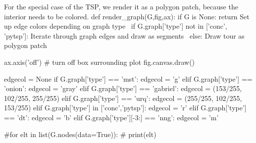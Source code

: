 For the special case of the TSP, we render it as a polygon patch, because the interior
needs to be colored. 
\nwenddocs{}\plusendmoddef\nwstartdeflinemarkup{}\nwenddeflinemarkup
def render_graph(G,fig,ax):
     if G is None:
            return
     \LA{}Set up edge colors depending on graph type~{\nwtagstyle{}}\RA{}
     if G.graph['type'] not in ['conc', 'pytsp']:
          \LA{}Iterate through graph edges and draw as segments~{\nwtagstyle{}}\RA{}
     else:
          \LA{}Draw tour as polygon patch~{\nwtagstyle{}}\RA{}
          
     ax.axis('off') # turn off box surrounding plot
     fig.canvas.draw()
\nwendcode{}\nwdocspar

\nwenddocs{}\endmoddef\nwstartdeflinemarkup{}\nwenddeflinemarkup
edgecol = None
if G.graph['type'] == 'mst':
     edgecol = 'g'
elif G.graph['type'] == 'onion':
     edgecol = 'gray'
elif G.graph['type'] == 'gabriel':
     edgecol = (153/255, 102/255, 255/255)
elif G.graph['type'] == 'urq':
     edgecol = (255/255, 102/255, 153/255)
elif G.graph['type'] in ['conc','pytsp']:
     edgecol = 'r'
elif G.graph['type'] == 'dt':
     edgecol = 'b'
elif G.graph['type'][-3:] == 'nng':
     edgecol = 'm'
\nwendcode{}\nwdocspar


\nwenddocs{}\endmoddef\nwstartdeflinemarkup{}\nwenddeflinemarkup

#for elt in list(G.nodes(data=True)):
#     print(elt)


